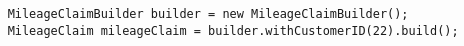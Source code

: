 \begin{verbatim}
    MileageClaimBuilder builder = new MileageClaimBuilder();
    MileageClaim mileageClaim = builder.withCustomerID(22).build();
\end{verbatim}